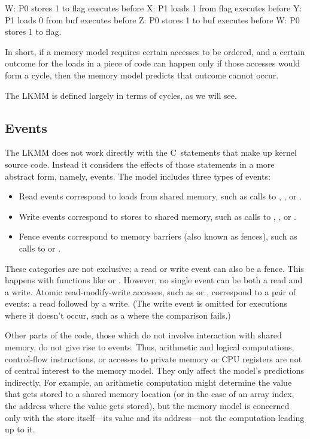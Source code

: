 \begin{VerbatimU}
	W: P0 stores 1 to flag   executes before
	X: P1 loads 1 from flag  executes before
	Y: P1 loads 0 from buf   executes before
	Z: P0 stores 1 to buf    executes before
	W: P0 stores 1 to flag.
\end{VerbatimU}

In short, if a memory model requires certain accesses to be ordered,
and a certain outcome for the loads in a piece of code can happen only
if those accesses would form a cycle, then the memory model predicts
that outcome cannot occur.

The LKMM is defined largely in terms of cycles, as we will see.


\subsection{Events}
\label{sec:docs:explanation:Events}

The LKMM does not work directly with the C~statements that make up
kernel source code.
Instead it considers the effects of those statements in a more
abstract form, namely, events.
The model includes three types of events:

\begin{itemize}
\item	Read events correspond to loads from shared memory, such as
	calls to , , or
	.

\item	Write events correspond to stores to shared memory, such as
	calls to , , or
	.

\item	Fence events correspond to memory barriers (also known as
	fences), such as calls to  or .
\end{itemize}

These categories are not exclusive; a read or write event can also be
a fence.
This happens with functions like  or .
However, no single event can be both a read and a write.
Atomic read-modify-write accesses, such as  or ,
correspond to a pair of events: a read followed by a write.
(The write event is omitted for executions where it doesn't occur,
such as a  where the comparison fails.)

Other parts of the code, those which do not involve interaction with
shared memory, do not give rise to events.
Thus, arithmetic and logical computations, control-flow instructions,
or accesses to private memory or CPU registers are not of central
interest to the memory model.
They only affect the model's predictions indirectly.
For example, an arithmetic computation might determine the value that
gets stored to a shared memory location (or in the case of an array
index, the address where the value gets stored), but the memory model
is concerned only with the store itself---its value and its
address---not the computation leading up to it.

